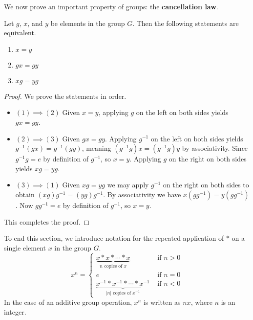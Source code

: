 We now prove an important property of groups: the \textbf{cancellation law}.
\begin{proposition}
    Let $g$, $x$, and $y$ be elements in the group $G$. Then the following statements are equivalent.
    \begin{enumerate}[label=(\arabic*)]
        \item $x = y$
        \item $gx = gy$
        \item $xg = yg$
    \end{enumerate}
\end{proposition}
\begin{proof}
    We prove the statements in order.
    \begin{itemize}
        \item $\boxed{(1) \implies (2)}$ Given $x = y$, applying $g$ on the left on both sides yields $gx = gy$.
        
        \item $\boxed{(2) \implies (3)}$ Given $gx = gy$. Applying 
        $g^{-1}$ on the left on both sides yields $g^{-1}(gx) = g^{-1}(gy)$, meaning $(g^{-1}g)x = (g^{-1}g)y$ by associativity. Since $g^{-1}g = e$ by definition of $g^{-1}$, so $x = y$. Applying $g$ on the right on both sides yields $xg = yg$.
        
        \item $\boxed{(3) \implies (1)}$ Given $xg = yg$ we may apply $g^{-1}$ on the right on both sides to obtain $(xg)g^{-1} = (yg)g^{-1}$. By associativity we have $x(gg^{-1}) = y(gg^{-1})$. Now $gg^{-1} = e$ by definition of $g^{-1}$, so $x = y$.
    \end{itemize}
    This completes the proof.
\end{proof}

To end this section, we introduce notation for the repeated application of $\ast$ on a single element $x$ in the group $G$.
\[
    x^n =
    \begin{cases}
        \underbrace{x\ast x\ast \cdots \ast x}_{n \text{ copies of } x} & \text{ if } n > 0\\
        e & \text{ if } n=0 \\
        \underbrace{x^{-1}\ast x^{-1}\ast \cdots \ast x^{-1}}_{|n| \text{ copies of } x^{-1}} & \text{ if } n<0
    \end{cases}
\]
In the case of an additive group operation, $x^n$ is written as $nx$, where $n$ is an integer.

